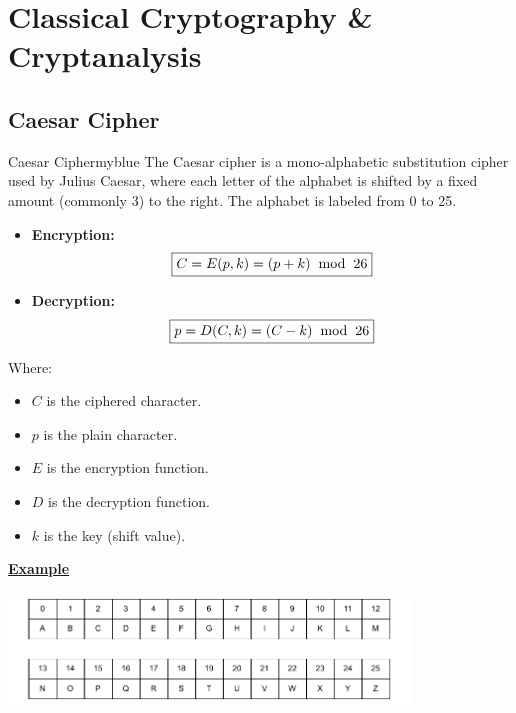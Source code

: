 \section{Classical Cryptography \& Cryptanalysis}
\subsection{Caesar Cipher}

\begin{prettyBox}{Caesar Cipher}{myblue}
The Caesar cipher is a mono-alphabetic substitution cipher used by Julius Caesar, where each letter of the
alphabet is shifted by a fixed amount (commonly 3) to the right. The alphabet is labeled from
0 to 25.

\begin{itemize}
    \item \textbf{Encryption:}  
        \[\boxed{C = E(p,k) = (p + k) \hspace{0.2cm} \text{mod} \hspace{0.2cm} 26}\]
    \item \textbf{Decryption:}  
        \[\boxed{p = D(C,k) = (C - k) \hspace{0.2cm} \text{mod} \hspace{0.2cm} 26}\] 
\end{itemize}

Where:
\begin{itemize}
    \item \(C\) is the ciphered character.
    \item \(p\) is the plain character.
    \item \(E\) is the encryption function.
    \item \(D\) is the decryption function.
    \item \(k\) is the key (shift value).
\end{itemize}
\end{prettyBox}

\vspace{1cm}

\textbf{\underline{Example}}

\begin{center}
    \includegraphics[width=0.8\textwidth]{Chapters/Diagram/Crypto/tab.drawio.pdf}
\end{center}

